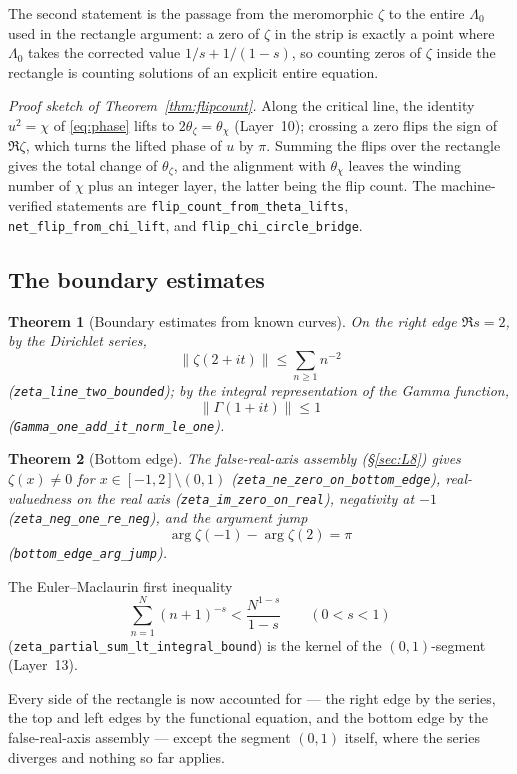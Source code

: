 \documentclass{article}
\newtheorem{theorem}{Theorem}[section]
\newcommand{\GG}{\Gamma}
\newcommand{\zt}{\zeta}
\newcommand{\Lam}{\Lambda}
\newcommand{\Xchi}{\chi}
\begin{document}
The second statement is the passage from the meromorphic $\zt$ to the
entire $\Lam_0$ used in the rectangle argument: a zero of $\zt$ in the
strip is exactly a point where $\Lam_0$ takes the corrected value
$1/s+1/(1-s)$, so counting zeros of $\zt$ inside the rectangle is counting
solutions of an explicit entire equation.

\emph{Proof sketch of Theorem~\ref{thm:flipcount}.} Along the critical
line, the identity $u^2=\Xchi$ of \eqref{eq:phase} lifts to
$2\theta_{\zt}=\theta_{\Xchi}$ (Layer~10); crossing a zero flips the sign
of $\Re\zt$, which turns the lifted phase of $u$ by $\pi$. Summing the
flips over the rectangle gives the total change of $\theta_{\zt}$, and the
alignment with $\theta_{\Xchi}$ leaves the winding number of $\Xchi$ plus
an integer layer, the latter being the flip count. The machine-verified
statements are \texttt{flip\_count\_from\_theta\_lifts},
\texttt{net\_flip\_from\_chi\_lift}, and
\texttt{flip\_chi\_circle\_bridge}.

\subsection{The boundary estimates}
\label{sec:boundary}

\begin{theorem}[Boundary estimates from known curves]
\label{thm:boundary}
On the right edge $\Re s=2$, by the Dirichlet series,
\[
\|\zt(2+it)\|\le \sum_{n\ge 1}n^{-2}
\]
(\texttt{zeta\_line\_two\_bounded}); by the integral representation of the
Gamma function,
\[
\|\GG(1+it)\|\le 1
\]
(\texttt{Gamma\_one\_add\_it\_norm\_le\_one}).
\end{theorem}

\begin{theorem}[Bottom edge]
\label{thm:bottom}
The false-real-axis assembly (\S\ref{sec:L8}) gives $\zt(x)\neq 0$ for
$x\in[-1,2]\setminus(0,1)$ (\texttt{zeta\_ne\_zero\_on\_bottom\_edge}),
real-valuedness on the real axis (\texttt{zeta\_im\_zero\_on\_real}),
negativity at $-1$ (\texttt{zeta\_neg\_one\_re\_neg}), and the argument
jump
\[
\arg\zt(-1)-\arg\zt(2)=\pi
\]
(\texttt{bottom\_edge\_arg\_jump}).
\end{theorem}

The Euler--Maclaurin first inequality
\[
\sum_{n=1}^{N}(n+1)^{-s}<\frac{N^{1-s}}{1-s}\qquad(0<s<1)
\]
(\texttt{zeta\_partial\_sum\_lt\_integral\_bound}) is the kernel of the
$(0,1)$-segment (Layer~13).

Every side of the rectangle is now accounted for --- the right edge by
the series, the top and left edges by the functional equation, and the
bottom edge by the false-real-axis assembly --- except the segment
$(0,1)$ itself, where the series diverges and nothing so far applies.
\end{document}
